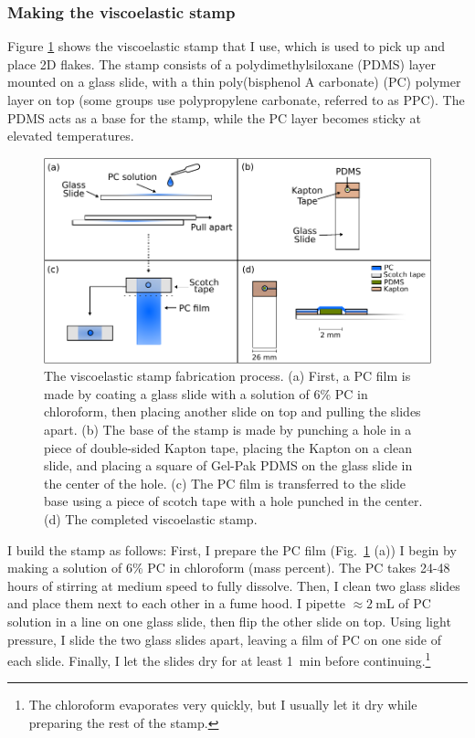 \documentclass[double,12pt,1in,seploa]{beavtex}
\let\Oldsubsubsection\subsubsection
\renewcommand{\subsubsection}{\FloatBarrier\Oldsubsubsection}
\begin{document}
\subsubsection{Making the viscoelastic stamp} \label{making the PC stamp section}

Figure \ref{stamp diagram} shows the viscoelastic stamp that I use, which is used to pick up and place 2D flakes. The stamp consists of a polydimethylsiloxane (PDMS) layer mounted on a glass slide, with a thin poly(bisphenol A carbonate) (PC) polymer layer on top (some groups use polypropylene carbonate, referred to as PPC). The PDMS acts as a base for the stamp, while the PC layer becomes sticky at elevated temperatures.


\begin{figure}
    \includegraphics[width = 1\textwidth]{stamp making diagram.pdf}
    \caption{The viscoelastic stamp fabrication process. (a) First, a PC film is made by coating a glass slide with a solution of 6\% PC in chloroform, then placing another slide on top and pulling the slides apart. (b) The base of the stamp is made by punching a hole in a piece of double-sided Kapton tape, placing the Kapton on a clean slide, and placing a square of Gel-Pak PDMS on the glass slide in the center of the hole. (c) The PC film is transferred to the slide base using a piece of scotch tape with a hole punched in the center. (d) The completed viscoelastic stamp.}
    \label{stamp diagram}
\end{figure}


I build the stamp as follows: First, I prepare the PC film (Fig.\ \ref{stamp diagram} (a)) I begin by making a solution of 6\% PC in chloroform (mass percent). The PC takes 24-48 hours of stirring at medium speed to fully dissolve. Then, I clean two glass slides and place them next to each other in a fume hood. I pipette $\approx \SI{2}{\milli\liter}$ of PC solution in a line on one glass slide, then flip the other slide on top. Using light pressure, I slide the two glass slides apart, leaving a film of PC on one side of each slide. Finally, I let the slides dry for at least \SI{1}{\minute} before continuing.\footnote{The chloroform evaporates very quickly, but I usually let it dry while preparing the rest of the stamp.}
\end{document}

